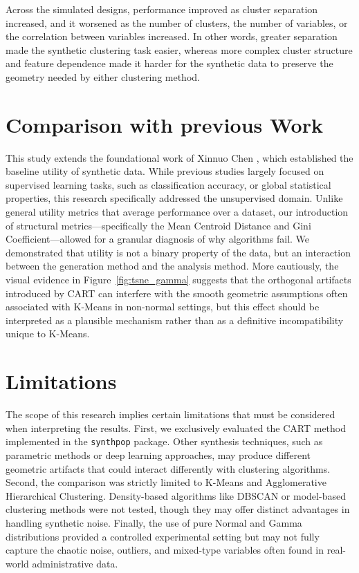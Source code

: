 Across the simulated designs, performance improved as cluster separation increased, and it worsened as the number of clusters, the number of variables, or the correlation between variables increased. In other words, greater separation made the synthetic clustering task easier, whereas more complex cluster structure and feature dependence made it harder for the synthetic data to preserve the geometry needed by either clustering method.

\section{Comparison with previous Work}
\label{sec:comparison}

This study extends the foundational work of Xinnuo Chen \cite{chen2025}, which established the baseline utility of synthetic data. While previous studies largely focused on supervised learning tasks, such as classification accuracy, or global statistical properties, this research specifically addressed the unsupervised domain. Unlike general utility metrics that average performance over a dataset, our introduction of structural metrics---specifically the Mean Centroid Distance and Gini Coefficient---allowed for a granular diagnosis of why algorithms fail. We demonstrated that utility is not a binary property of the data, but an interaction between the generation method and the analysis method. More cautiously, the visual evidence in Figure~\ref{fig:tsne_gamma} suggests that the orthogonal artifacts introduced by CART can interfere with the smooth geometric assumptions often associated with K-Means in non-normal settings, but this effect should be interpreted as a plausible mechanism rather than as a definitive incompatibility unique to K-Means.

\section{Limitations}
\label{sec:limitations-conclusions}

The scope of this research implies certain limitations that must be considered when interpreting the results. First, we exclusively evaluated the CART method implemented in the \texttt{synthpop} package. Other synthesis techniques, such as parametric methods or deep learning approaches, may produce different geometric artifacts that could interact differently with clustering algorithms. Second, the comparison was strictly limited to K-Means and Agglomerative Hierarchical Clustering. Density-based algorithms like DBSCAN or model-based clustering methods were not tested, though they may offer distinct advantages in handling synthetic noise. Finally, the use of pure Normal and Gamma distributions provided a controlled experimental setting but may not fully capture the chaotic noise, outliers, and mixed-type variables often found in real-world administrative data.

